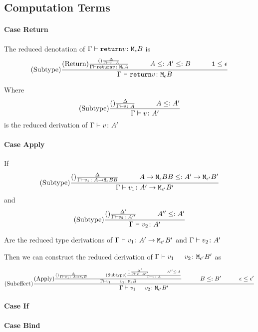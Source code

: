 \documentclass{report}
\begin{document}
    \subsection{Computation Terms}
    \paragraph{Case Return}
    The reduced denotation of $\Gamma \vdash \texttt{return} v \colon \texttt{M}_{\epsilon}{B}$ is 
    $$
        \treerule{Subtype}
        {
            \treerule{Return}
            {\treerule{}{\D}{\gtyperelation{v}{A}}}
            {\gtyperelation{\return{v}}{\moa}}
            \s\s
            A \subtype A' \subtype B
            \s\s
            \1 \subeffect \e
        }
        {\gtyperelation{\return{v}}{\meb}}
    $$

    Where $$\deltavrule{\G}{v}{A}{A'}$$ is the reduced derivation of $\Gamma \vdash v \colon A'$
    
    \paragraph{Case Apply}
    If 
    $$
        \deltavrule{\G}{v_1}{\lamtype{A}{\e}{BB}}{\lamtype{A'}{\e'}{B'}}
    $$ and $$
        \deltavruleprime{\G}{v_2}{A''}{A'}
    $$

    Are the reduced type derivations of $\Gamma \vdash v_1 \colon A' \rightarrow \texttt{M}_{\epsilon'}{B'}$ and $\Gamma \vdash v_2 \colon A'$



    Then we can construct the reduced derivation of $\gtyperelation{\apply{v_1}{v_2}}{\M{\e'}{B'}}$ as

    $$
        \treerule{Subeffect}{
            \treerule{Apply}{
                \treerule{}{\D}{
                    \gtyperelation{v_1}{\lamtype{A}{\e}{B}}
                }
                \s\s
                \treerule{Subtype}{
                    \treerule{}{\D'}{
                        \gtyperelation{v}{A''}
                    } \s\s A'' \subtype A
                }
                {\gtyperelation{v}{A}}
            }{
                \gtyperelation{\apply{v_1}{v_2}}{\meb}
            }
            \s\s
            B \subtype B'
            \s\s
            \e \subeffect \e'
        }{
            \gtyperelation{\apply{v_1}{v_2}}{\M{\e'}{B'}}
        }
    $$
    \paragraph{Case If}
    \paragraph{Case Bind}
\end{document}
